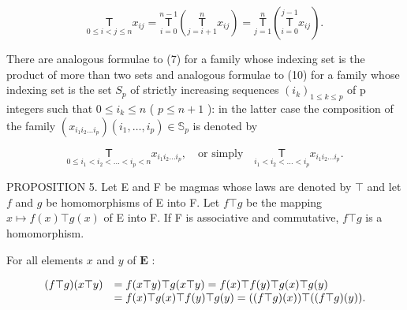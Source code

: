 \[
\underset {0 \leqslant i <   j \leqslant n} {\mathsf {T}} x _ {i j} = \underset {i = 0} {\overset {n - 1} {\mathsf {T}}} \left(\underset {j = i + 1} {\overset {n} {\mathsf {T}}} x _ {i j}\right) = \underset {j = 1} {\overset {n} {\mathsf {T}}} \left(\underset {i = 0} {\overset {j - 1} {\mathsf {T}}} x _ {i j}\right).\tag{10}
\]

There are analogous formulae to (7) for a family whose indexing set is the product of more than two sets and analogous formulae to (10) for a family whose indexing set is the set \(S_{p}\) of strictly increasing sequences \((i_{k})_{1\leqslant k\leqslant p}\) of p integers such that \(0\leqslant i_{k}\leqslant n\) ( \(p\leqslant n+1\) ): in the latter case the composition of the family \((x_{i_{1}i_{2}\ldots i_{p}})(i_{1},\ldots,i_{p})\in\mathbb{S}_{p}\) is denoted by

\[
\underset {0 \leqslant i _ {1} <   i _ {2} <   \dots <   i _ {p} <   n} {\mathsf {T}} x _ {i _ {1} i _ {2} \ldots i _ {p}}, \quad \text {or simply} \quad \underset {i _ {1} <   i _ {2} <   \dots <   i _ {p}} {\mathsf {T}} x _ {i _ {1} i _ {2} \ldots i _ {p}}.
\]

PROPOSITION 5. Let E and F be magmas whose laws are denoted by \(\top\) and let \(f\) and \(g\) be homomorphisms of E into F. Let \(f \top g\) be the mapping \(x \mapsto f(x) \top g(x)\) of E into F. If F is associative and commutative, \(f \top g\) is a homomorphism.

For all elements \(x\) and \(y\) of \(\mathbf{E}\) :

\[
\begin{array}{r l} (f \top g) (x \top y) & = f (x \top y) \top g (x \top y) = f (x) \top f (y) \top g (x) \top g (y) \\ & = f (x) \top g (x) \top f (y) \top g (y) = ((f \top g) (x)) \top ((f \top g) (y)). \end{array}
\]

